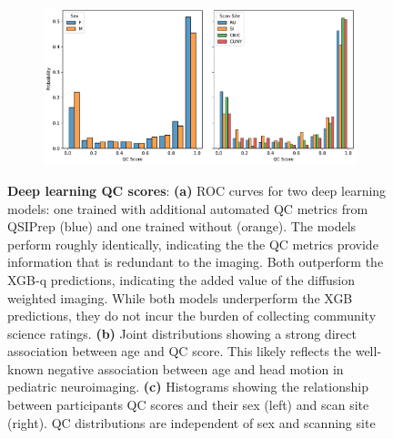 \documentclass[fleqn,10pt]{wlscirep}
\begin{document}
\begin{figure}[htbp]
\begin{subfigure}{.25\textwidth}
    \caption{}
    \label{fig:dl-qc:joint}
    \end{subfigure}
    \begin{subfigure}{.5\textwidth}
    \centering
    \includegraphics[width=\linewidth]{bundle-profiles/qc-hist.pdf}
    \caption{}
    \label{fig:dl-qc:hist}
    \end{subfigure}
    \caption{%
        {\bf Deep learning QC scores}:
        \textbf{(a)} ROC curves for two deep learning models: one trained with
        additional automated QC metrics from QSIPrep (blue) and one trained
        without (orange). The models perform roughly identically, indicating the
        the QC metrics provide information that is redundant to the imaging.
        Both outperform the XGB-q predictions, indicating the added value of
        the diffusion weighted imaging. While both models underperform the
        XGB predictions, they do not incur the burden of collecting community
        science ratings.
        \textbf{(b)} Joint distributions showing a strong direct association
        between age and QC score. This likely reflects the well-known negative
        association between age and head motion in pediatric neuroimaging.
        \textbf{(c)}
        Histograms showing the relationship between participants QC scores and
        their sex (left) and scan site (right). QC distributions are independent
        of sex and scanning site
    }
    \label{fig:dl-qc}
\end{figure}
\end{document}
